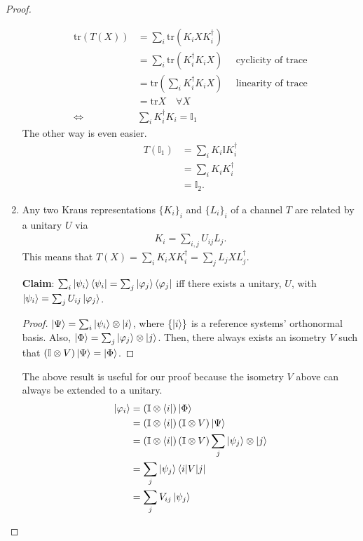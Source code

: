 \documentclass[10pt,oneside,longbibliography]{report}
\begin{document}
\begin{tcolorbox}[colframe=black,breakable, colback=black!5, arc=0pt, outer arc=0pt,boxrule=0.5pt]
\begin{proof}
\begin{enumerate}
    \begin{align}
        \text{tr}(T(X)) &= \sum_i \text{tr} \left(K_i X K_i^{\dagger}\right) \\
        &= \sum_i \text{tr} \left(K_i^{\dagger} K_i X\right) \quad \text{ cyclicity of trace}\\
        &= \text{tr}\left(\sum_i K_i^{\dagger} K_i X\right) \quad \text{ linearity of trace}\\
        &=\text{tr}X \quad \forall X\\
        \Leftrightarrow & \sum_i K_i^{\dagger}K_i = \mathbb{I}_1
    \end{align}
    The other way is even easier. 
    \begin{align}
        T(\mathbb{I}_1) &= \sum_i K_i \mathbb{I} K_i^{\dagger} \\
        &= \sum_i K_i K_i^{\dagger} \\
        &= \mathbb{I}_2.
    \end{align}
    
    \item Any two Kraus representations $\{K_i\}_i$ and $\{L_i\}_i$ of a channel $T$ are related by a unitary $U$ via 
    \begin{align}
        K_i = \sum_{i,j} U_{ij}L_j.
    \end{align}
    This means that $T(X)=\sum_i K_i X K_i^{\dagger} = \sum_j L_j X L_j^{\dagger}$.
    
    \textbf{Claim}: $\sum_i \ket{\psi_i}\bra{\psi_i} = \sum_j \ket{\varphi_j} \bra{\varphi_j}$ iff there exists a unitary, $U$, with $\ket{\psi_i} = \sum_j U_{ij} \ket{\varphi_j}$.
    
    \begin{proof}
    $\ket{\Psi}=\sum_i \ket{\psi_i} \otimes \ket{i}$, where $\{\ket{i}\}$ is a reference systems' orthonormal basis. Also, $\ket{\Phi}=\sum_j \ket{\varphi_j} \otimes \ket{j}$. Then, there always exists an isometry $V$ such that $(\mathbb{I}\otimes V) \ket{\Psi} = \ket{\Phi}$.
    \end{proof}
    The above result is useful for our proof because the isometry $V$ above can always be extended to a unitary.
    \begin{align}
        \ket{\varphi_i}&= \left(\mathbb{I} \otimes \bra{i}\right)\ket{\Phi} \\
        &= \left(\mathbb{I}\otimes \bra{i}\right)(\mathbb{I}\otimes V)\ket{\Psi} \\
        &= \left(\mathbb{I}\otimes \bra{i}\right)(\mathbb{I}\otimes V)\sum_j \ket{\psi_j} \otimes \ket{j}\\
        &= \sum_j \ket{\psi_j} \bra{i|V|j}\\
        &= \sum_j V_{ij} \ket{\psi_j}
    \end{align}
\end{enumerate}
\end{proof}
\end{tcolorbox}
\end{document}
